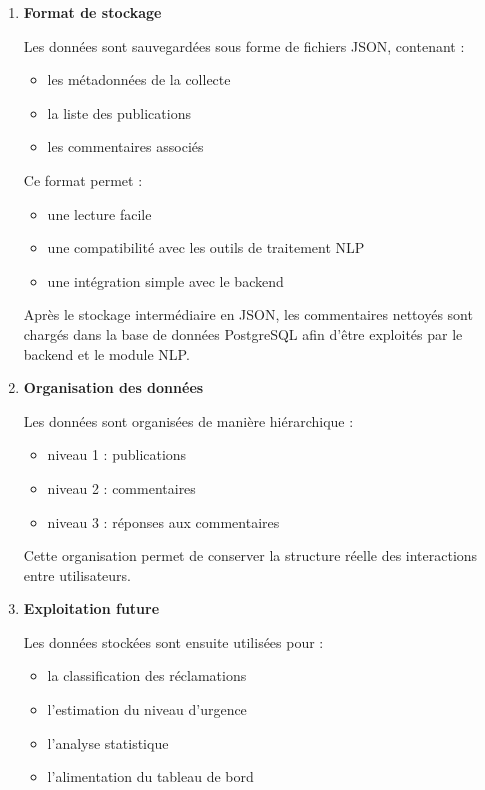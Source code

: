 \documentclass[12pt,a4paper,oneside]{report}
\begin{document}
\begin{enumerate}
    \item \textbf{Format de stockage}

    Les données sont sauvegardées sous forme de fichiers JSON, contenant :
    
    \begin{itemize}
        \item les métadonnées de la collecte
        \item la liste des publications
        \item les commentaires associés
    \end{itemize}
    
    Ce format permet :
    
    \begin{itemize}
        \item une lecture facile
        \item une compatibilité avec les outils de traitement NLP
        \item une intégration simple avec le backend
    \end{itemize}

    Après le stockage intermédiaire en JSON, les commentaires nettoyés sont chargés dans la base de données PostgreSQL afin d’être exploités par le backend et le module NLP.


     \item \textbf{Organisation des données}
    
    Les données sont organisées de manière hiérarchique :
    
    \begin{itemize}
            \item niveau 1 : publications
            \item niveau 2 : commentaires
            \item niveau 3 : réponses aux commentaires
    \end{itemize}
    
    Cette organisation permet de conserver la structure réelle des interactions entre utilisateurs.
    
     \item \textbf{Exploitation future}
    
    Les données stockées sont ensuite utilisées pour :
    
    \begin{itemize}
        \item la classification des réclamations
        \item l’estimation du niveau d’urgence
        \item l’analyse statistique
        \item l’alimentation du tableau de bord
    \end{itemize}
\end{enumerate}
\end{document}
